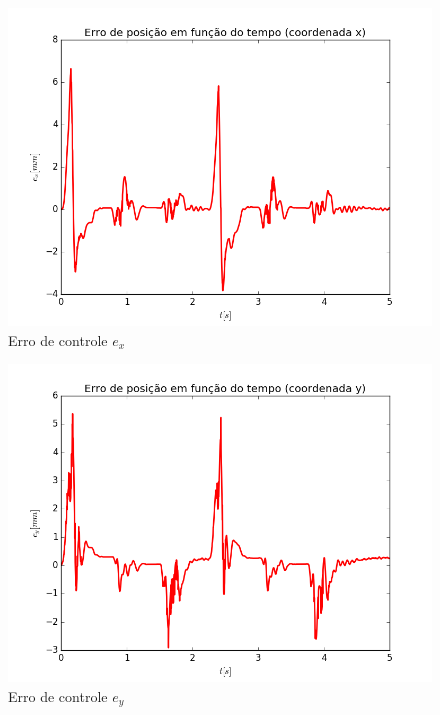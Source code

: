 \documentclass[]{politex}
\begin{document}
\begin{multicols}{2}
\begin{figure}[H]
	\centering
	\includegraphics[scale=0.39]{../../../Experimental/Aquisicoes/SMCx_triangulo/ex.png}  
	\caption{Erro de controle $e_x$}
	\label{fig:SMCx_triangulo_ex}
\end{figure}
\begin{figure}[H]
	\centering
	\includegraphics[scale=0.39]{../../../Experimental/Aquisicoes/SMCx_triangulo/ey.png}  
	\caption{Erro de controle $e_y$}
	\label{fig:SMCx_triangulo_ey}
\end{figure}
\end{multicols}
\end{document}
